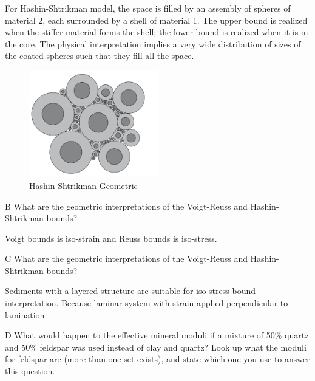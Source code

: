 \begin{solution}
    For Hashin-Shtrikman model, the space is filled by an assembly of spheres of material 2, each surrounded by a shell of material 1.
    The upper bound is realized when the stiffer material forms the shell; 
    the lower bound is realized when it is in the core. 
    The physical interpretation implies a very wide distribution of sizes of the 
    coated spheres such that they fill all the space.
    \begin{figure}[H]
        \centering
        \includegraphics[width=0.5\textwidth]{figures/homework-1/Hashin-Shtrikman-geometric.jpg}
        \caption{Hashin-Shtrikman Geometric}
        \label{fig:Hashin-Shtrikman-geometric}
    \end{figure}
\end{solution}


\begin{problem}{B}
    What are the geometric interpretations of the Voigt-Reuss and Hashin-Shtrikman bounds?
\end{problem}

\begin{solution}

    Voigt bounds is iso-strain and Reuss bounds is iso-stress.
\end{solution}



\begin{problem}{C}
    What are the geometric interpretations of the Voigt-Reuss and Hashin-Shtrikman bounds?
\end{problem}

\begin{solution}
    Sediments with a layered structure are suitable for iso-stress bound interpretation.
    Because laminar system with strain applied perpendicular to lamination
\end{solution}



\begin{problem}{D}
    What would happen to the effective mineral moduli if a mixture of 50\% quartz and 50\% feldspar was used instead of clay and quartz? Look up what the moduli for feldspar are (more than one set exists), and state which one you use to answer this question.
\end{problem}

